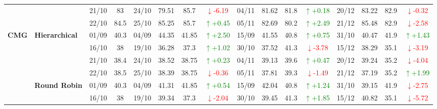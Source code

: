 {\begin{longtable}{llcc|cccc|cccc|cccc}
&
& 21/10 & 83 & 24/10 & 79.51 & 85.7 & \textcolor{red}{\(\downarrow\)-6.19} & 04/11 & 81.62 & 81.8 & \textcolor{green}{\(\uparrow\)+0.18} & 20/12 & 83.22 & 82.9 & \textcolor{red}{\(\downarrow\)-0.32} \\

&
& 22/10 & 84.5 & 25/10 & 85.25 & 85.7 & \textcolor{green}{\(\uparrow\)+0.45} & 05/11 & 82.69 & 80.2 & \textcolor{green}{\(\uparrow\)+2.49} & 21/12 & 85.48 & 82.9 & \textcolor{red}{\(\downarrow\)-2.58} \\




\midrule


\multirow{12}{*}{\textbf{CMG}} 
& \textbf{Hierarchical}
& 01/09 & 40.3 & 04/09 & 44.35 & 41.85 & \textcolor{green}{\(\uparrow\)+2.50} & 15/09 & 41.55 & 40.8 & \textcolor{green}{\(\uparrow\)+0.75} & 31/10 & 40.47 & 41.9 & \textcolor{green}{\(\uparrow\)+1.43} \\

& 
& 16/10 & 38 & 19/10 & 36.28 & 37.3 & \textcolor{green}{\(\uparrow\)+1.02} & 30/10 & 37.52 & 41.3 & \textcolor{red}{\(\downarrow\)-3.78} & 15/12 & 38.29 & 35.1 & \textcolor{red}{\(\downarrow\)-3.19} \\

& 
& 21/10 & 38.4 & 24/10 & 38.52 & 38.75 & \textcolor{green}{\(\uparrow\)+0.23} & 04/11 & 39.13 & 39.6 & \textcolor{green}{\(\uparrow\)+0.47} & 20/12 & 39.24 & 35.2 & \textcolor{red}{\(\downarrow\)-4.04} \\

&
& 22/10 & 38.5 & 25/10 & 38.39 & 38.75 & \textcolor{red}{\(\downarrow\)-0.36} & 05/11 & 37.81 & 39.3 & \textcolor{red}{\(\downarrow\)-1.49} & 21/12 & 37.19 & 35.2 & \textcolor{green}{\(\uparrow\)+1.99} \\
\cmidrule(lr){2-16}


& \textbf{Round Robin}
& 01/09 & 40.3 & 04/09 & 41.31 & 41.85 & \textcolor{green}{\(\uparrow\)+0.54} & 15/09 & 42.04 & 40.8 & \textcolor{green}{\(\uparrow\)+1.24} & 31/10 & 39.15 & 41.9 & \textcolor{red}{\(\downarrow\)-2.75} \\

& 
& 16/10 & 38 & 19/10 & 39.34 & 37.3 & \textcolor{red}{\(\downarrow\)-2.04} & 30/10 & 39.45 & 41.3 & \textcolor{green}{\(\uparrow\)+1.85} & 15/12 & 40.82 & 35.1 & \textcolor{red}{\(\downarrow\)-5.72} \\


\end{longtable}}
